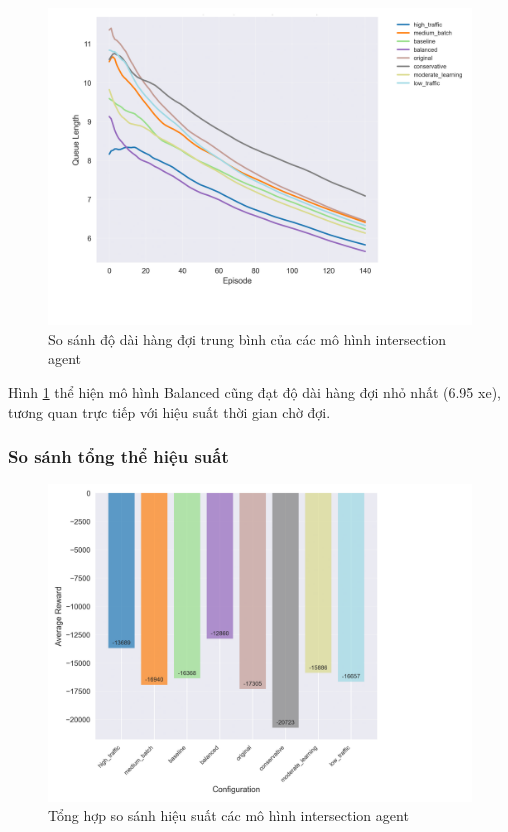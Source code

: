 \begin{figure}[!htp]
    \centering
    \includegraphics[width=\textwidth]{
        figures/individual_plots/intersection_filtered_queue_length.png
    }
    \caption{So sánh độ dài hàng đợi trung bình của các mô hình intersection
    agent}
    \label{fig:intersection_filtered_queue_length}
\end{figure}

Hình \ref{fig:intersection_filtered_queue_length} thể hiện mô hình Balanced cũng
đạt độ dài hàng đợi nhỏ nhất (6.95 xe), tương quan trực tiếp với hiệu suất thời
gian chờ đợi.

\subsubsection{So sánh tổng thể hiệu suất}

\begin{figure}[!htp]
    \centering
    \includegraphics[width=\textwidth]{
        figures/individual_plots/intersection_filtered_performance_summary.png
    }
    \caption{Tổng hợp so sánh hiệu suất các mô hình intersection agent}
    \label{fig:intersection_filtered_performance_summary}
\end{figure}

